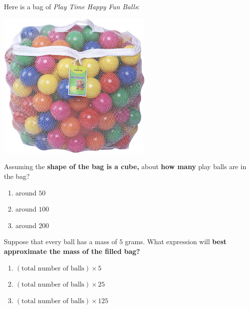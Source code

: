 \documentclass[handout,noauthor,nooutcomes]{ximera}
\author{Bart Snapp}
\begin{document}
\maketitle


\begin{exercise}
  Here is a bag of \textit{Play Time Happy Fun Balls}:
  \begin{center}
    \includegraphics[width=3in]{ballsInBag.jpg}
  \end{center}
  Assuming the \textbf{shape of the bag is a cube,} about \textbf{how many} play balls are in the bag?
  \begin{enumerate}
  \item around $50$
  \item around $100$
  \item around $200$
  \end{enumerate}
\end{exercise}


\begin{exercise}
  Suppose that every ball has a mass of $5$ grams.  What expression
  will \textbf{best approximate the mass of the filled bag?}
  \begin{enumerate}
  \item $(\text{total number of balls})\times5$
  \item $(\text{total number of balls})\times25$
  \item $(\text{total number of balls})\times125$
  \end{enumerate}
\end{exercise}
\end{document}

